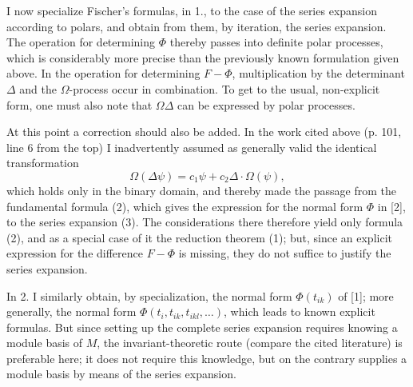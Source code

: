 \documentclass[11pt]{article}
\begin{document}
I now specialize Fischer's formulas, in 1., to the case of the series expansion according to polars, and obtain from them, by iteration, the series expansion. The operation for determining $\Phi$ thereby passes into definite polar processes, which is considerably more precise than the previously known formulation given above. In the operation for determining $F-\Phi$, multiplication by the determinant $\Delta$ and the $\Omega$-process occur in combination. To get to the usual, non-explicit form, one must also note that $\Omega\Delta$ can be expressed by polar processes.

At this point a correction should also be added. In the work cited above (p. 101, line 6 from the top) I inadvertently assumed as generally valid the identical transformation
\[
        \Omega(\Delta\psi)=c_1\psi+c_2\Delta\cdot\Omega(\psi),
\]
which holds only in the binary domain, and thereby made the passage from the fundamental formula (2), which gives the expression for the normal form $\Phi$ in [2], to the series expansion (3). The considerations there therefore yield only formula (2), and as a special case of it the reduction theorem (1); but, since an explicit expression for the difference $F-\Phi$ is missing, they do not suffice to justify the series expansion.

In 2. I similarly obtain, by specialization, the normal form $\Phi(t_{ik})$ of [1]; more generally, the normal form $\Phi(t_i,t_{ik},t_{ikl},\ldots)$, which leads to known explicit formulas. But since setting up the complete series expansion requires knowing a module basis of $M$, the invariant-theoretic route (compare the cited literature) is preferable here; it does not require this knowledge, but on the contrary supplies a module basis by means of the series expansion.
\end{document}
